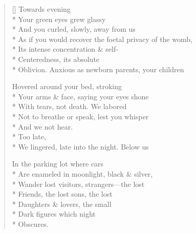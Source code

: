 \label{ch:nightfall}
\settowidth{\versewidth}{Oblivion. \qquad Anxious as newborn parents, your children}
\begin{verse}[\versewidth]
Towards evening\\*
Your green eyes grew glassy\\*
And you curled, slowly, away from us\\*
As if you would recover the foetal privacy of the womb,\\*
Its intense concentration \& self-\\*
Centeredness, its absolute\\*
Oblivion. \qquad Anxious as newborn parents, your children

Hovered around your bed, stroking\\*
Your arms \& face, saying your eyes shone\\*
With tears, not death. We labored\\*
Not to breathe or speak, lest you whisper\\*
And we not hear.\\*
\hfill Too late,\\*
We lingered, late into the night. Below us

In the parking lot where cars\\*
Are enameled in moonlight, black \& silver,\\*
Wander lost visitors, strangers---the lost\\*
Friends, the lost sons, the lost\\*
Daughters \& lovers, the small\\*
Dark figures which night\\*
Obscures.
\end{verse}
